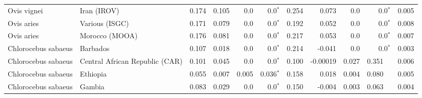 \begin{center}
\begin{adjustbox}{width = 1\textwidth}
\begin{tabular}{|l|l|r|r|r|r|r|r|r|r|r|}
         Ovis vignei &                     Iran (IROV) &                 0.174 &                                0.105 &                  0.0 &                             0.0$\bm{^*}$ &                 0.254 &                                0.073 &                  0.0 &                             0.0$\bm{^*}$ &              0.005 \\
          Ovis aries &                  Various (ISGC) &                 0.171 &                                0.079 &                  0.0 &                             0.0$\bm{^*}$ &                 0.192 &                                0.052 &                  0.0 &                             0.0$\bm{^*}$ &              0.008 \\
          Ovis aries &                  Morocco (MOOA) &                 0.176 &                                0.081 &                  0.0 &                             0.0$\bm{^*}$ &                 0.217 &                                0.053 &                  0.0 &                             0.0$\bm{^*}$ &              0.007 \\
 Chlorocebus sabaeus &                        Barbados &                 0.107 &                                0.018 &                  0.0 &                             0.0$\bm{^*}$ &                 0.214 &                               -0.041 &                  0.0 &                             0.0$\bm{^*}$ &              0.003 \\
 Chlorocebus sabaeus &  Central African Republic (CAR) &                 0.101 &                                0.045 &                  0.0 &                             0.0$\bm{^*}$ &                 0.100 &                             -0.00019 &                0.027 &                                  0.351~~ &              0.006 \\
 Chlorocebus sabaeus &                        Ethiopia &                 0.055 &                                0.007 &                0.005 &                           0.036$\bm{^*}$ &                 0.158 &                                0.018 &                0.004 &                                  0.080~~ &              0.005 \\
 Chlorocebus sabaeus &                          Gambia &                 0.083 &                                0.029 &                  0.0 &                             0.0$\bm{^*}$ &                 0.150 &                               -0.004 &                0.003 &                                  0.063~~ &              0.004 \\

\end{tabular}
\end{adjustbox}
\end{center}
